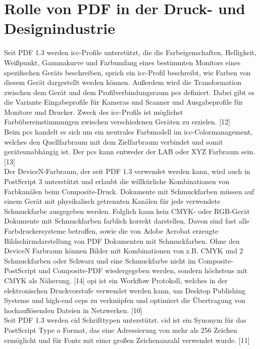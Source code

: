 \section{Rolle von PDF in der Druck- und Designindustrie}
Seit PDF 1.3 werden \gls{icc}-Profile unterstützt, die die Farbeigenschaften, Helligkeit, Weißpunkt, Gammakurve und Farbumfang eines bestimmten Monitors eines spezifischen Geräts beschreiben, sprich ein \gls{icc}-Profil beschreibt, wie Farben von diesem Gerät dargestellt werden können. Außerdem wird die Transformation zwischen dem Gerät und dem Profilverbindungsraum \gls{pcs} definiert. Dabei gibt es die Variante Eingabeprofile für Kameras und Scanner und Ausgabeprofile für Monitore und Drucker. Zweck des \gls{icc}-Profils ist möglichst Farbübereinstimmungen zwischen verschiedenen Geräten zu erzielen. [12] \\
Beim \gls{pcs} handelt es sich um ein neutrales Farbmodell im \gls{icc}-Colormanagement, welches den Quellfarbraum mit dem Zielfarbraum verbindet und somit geräteunabhängig ist. Der \gls{pcs} kann entweder der LAB oder XYZ Farbraum sein. [13] \\
Der DeviceN-Farbraum, der seit PDF 1.3 verwendet werden kann, wird auch in PostScript 3 unterstützt und erlaubt die willkürliche Kombinationen von Farbkanälen beim Composite-Druck. Dokumente mit Schmuckfarben müssen auf einem Gerät mit physikalisch getrennten Kanälen für jede verwendete Schmuckfarbe ausgegeben werden. Folglich kann kein CMYK- oder RGB-Gerät Dokumente mit Schmuckfarben farblich korrekt darstellen. Davon sind fast alle Farbdruckersysteme betroffen, sowie die von Adobe Acrobat erzeugte Bildschirmdarstellung von PDF Dokumenten mit Schmuckfarben. Ohne den DeviceN Farbraum können Bilder mit Kombinationen von z.B. CMYK und 2 Schmuckfarben oder Schwarz und eine Schmuckfarbe nicht im Composite-PostScript und Composite-PDF wiedergegeben werden, sondern höchstens mit CMYK als Näherung. [14] \gls{opi} ist ein Workflow Protokoll, welches in der elektronischen Druckvorstufe verwendet werden kann, um Desktop Publishing Systeme und high-end \gls{ceps} zu verknüpfen und optimiert die Übertragung von hochauflösenden Dateien in Netzwerken. [10] \\
Seit PDF 1.3 werden \gls{cid} Schrifttypen unterstützt. \gls{cid} ist ein Synonym für das PostScript Type o Format, das eine Adressierung von mehr als 256 Zeichen ermöglicht und für Fonts mit einer großen Zeichenanzahl verwendet wurde. [11]